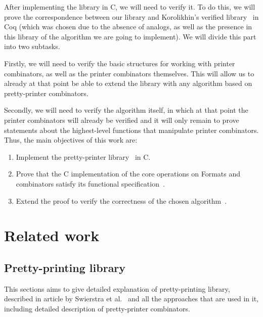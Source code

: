 \documentclass[14pt]{constructor-diploma}
\begin{document}
After implementing the library in C, we will need to verify it. 
To do this, we will prove the correspondence between our library and Korolikhin's verified library~\cite{korolihin} in Coq (which was chosen due to the absence of analogs, as well as the presence in this library of the algorithm we are going to implement).
We will divide this part into two subtasks. 

Firstly, we will need to verify the basic structures for working with printer combinators, as well as the printer combinators themselves. 
This will allow us to already at that point be able to extend the library with any algorithm based on pretty-printer combinators.

Secondly, we will need to verify the algorithm itself, in which at that point the printer combinators will already be verified and 
it will only remain to prove statements about the highest-level functions that manipulate printer combinators.
Thus, the main objectives of this work are:

\begin{enumerate}
  \item Implement the pretty-printer library~\cite{swierstra} in C.
  \item Prove that the C implementation of the core operations on Formats and combinators satisfy its functional specification~\cite{korolihin}.
  \item Extend the proof to verify the correctness of the chosen algorithm~\cite{swierstra}.
\end{enumerate}


\section{Related work}

\subsection{Pretty-printing library}

This sections aims to give detailed explanation of pretty-printing library, described in article by Swierstra et al.~\cites{swierstra} 
and all the approaches that are used in it, including detailed description of pretty-printer combinators.
\end{document}
